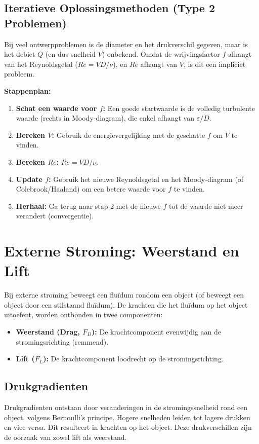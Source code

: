 \documentclass[a4paper,11pt,twoside]{report}
\begin{document}
\subsection{Iteratieve Oplossingsmethoden (Type 2 Problemen)}
Bij veel ontwerpproblemen is de diameter en het drukverschil gegeven, maar is het debiet $Q$ (en dus snelheid $V$) onbekend. Omdat de wrijvingsfactor $f$ afhangt van het Reynoldsgetal ($Re = VD/\nu$), en $Re$ afhangt van $V$, is dit een impliciet probleem.

\textbf{Stappenplan:}
\begin{enumerate}
    \item \textbf{Schat een waarde voor $f$:} Een goede startwaarde is de volledig turbulente waarde (rechts in Moody-diagram), die enkel afhangt van $\varepsilon/D$.
    \item \textbf{Bereken $V$:} Gebruik de energievergelijking met de geschatte $f$ om $V$ te vinden.
    \item \textbf{Bereken $Re$:} $Re = VD/\nu$.
    \item \textbf{Update $f$:} Gebruik het nieuwe Reynoldsgetal en het Moody-diagram (of Colebrook/Haaland) om een betere waarde voor $f$ te vinden.
    \item \textbf{Herhaal:} Ga terug naar stap 2 met de nieuwe $f$ tot de waarde niet meer verandert (convergentie).
\end{enumerate}

\section{Externe Stroming: Weerstand en Lift}
Bij externe stroming beweegt een fluïdum rondom een object (of beweegt een object door een stilstaand fluïdum). De krachten die het fluïdum op het object uitoefent, worden ontbonden in twee componenten:
\begin{itemize}
    \item \textbf{Weerstand (Drag, $F_D$):} De krachtcomponent evenwijdig aan de stromingsrichting (remmend).
    \item \textbf{Lift ($F_L$):} De krachtcomponent loodrecht op de stromingsrichting.
\end{itemize}

\subsection{Drukgradienten}

Drukgradienten ontstaan door veranderingen in de stromingssnelheid rond een object, volgens Bernoulli's principe. Hogere snelheden leiden tot lagere drukken en vice versa. Dit resulteert in krachten op het object.
Deze drukverschillen zijn de oorzaak van zowel lift als weerstand.
\end{document}
